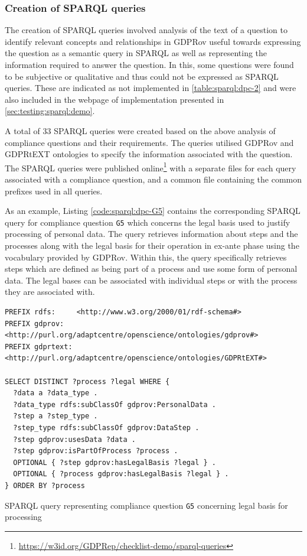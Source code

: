 \subsubsection{Creation of SPARQL queries}
The creation of SPARQL queries involved analysis of the text of a question to identify relevant concepts and relationships in GDPRov useful towards expressing the question as a semantic query in SPARQL as well as representing the information required to answer the question.
In this, some questions were found to be subjective or qualitative and thus could not be expressed as SPARQL queries. These are indicated as not implemented in \autoref{table:sparql:dpc-2} and were also included in the webpage of implementation presented in \autoref{sec:testing:sparql:demo}.

A total of 33 SPARQL queries were created based on the above analysis of compliance questions and their requirements.
The queries utilised GDPRov and GDPRtEXT ontologies to specify the information associated with the question.
The SPARQL queries were published online\footnote{\url{https://w3id.org/GDPRep/checklist-demo/sparql-queries}}
with a separate files for each query associated with a compliance question, and a common file containing the common prefixes used in all queries.

As an example, Listing \autoref{code:sparql:dpc-G5} contains the corresponding SPARQL query for compliance question \texttt{G5} which concerns the legal basis used to justify processing of personal data. 
The query retrieves information about steps and the processes along with the legal basis for their operation in ex-ante phase using the vocabulary provided by GDPRov.
Within this, the query specifically retrieves steps which are defined as being part of a process and use some form of personal data. 
The legal bases can be associated with individual steps or with the process they are associated with.
\begin{listing}[htbp]
\begin{verbatim}
PREFIX rdfs:     <http://www.w3.org/2000/01/rdf-schema#>
PREFIX gdprov:   <http://purl.org/adaptcentre/openscience/ontologies/gdprov#>
PREFIX gdprtext: <http://purl.org/adaptcentre/openscience/ontologies/GDPRtEXT#>

SELECT DISTINCT ?process ?legal WHERE {
  ?data a ?data_type .
  ?data_type rdfs:subClassOf gdprov:PersonalData .
  ?step a ?step_type .
  ?step_type rdfs:subClassOf gdprov:DataStep .
  ?step gdprov:usesData ?data . 
  ?step gdprov:isPartOfProcess ?process .
  OPTIONAL { ?step gdprov:hasLegalBasis ?legal } .
  OPTIONAL { ?process gdprov:hasLegalBasis ?legal } .
} ORDER BY ?process
\end{verbatim}
\caption{SPARQL query representing compliance question \texttt{G5} concerning legal basis for processing}
\label{code:sparql:dpc-G5}
\end{listing}

